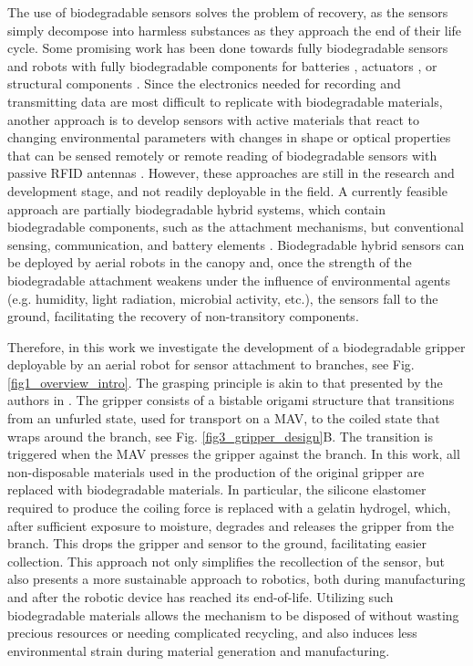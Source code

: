 The use of biodegradable sensors solves the problem of recovery, as the sensors simply decompose into harmless substances as they approach the end of their life cycle. Some promising work has been done towards fully biodegradable sensors and robots \cite{Sethi2022, Hartmann2021} with fully biodegradable components for batteries \cite{Yin2014, Wang2021, MicrobialCell}, actuators \cite{Baumgartner2020}, or structural components \cite{Wiesemuller2021Self-sensingStiffness, Hardman20213DStructures, Shintake2017}. Since the electronics needed for recording and transmitting data are most difficult to replicate with biodegradable materials, another approach is to develop sensors with active materials that react to changing environmental parameters with changes in shape or optical properties that can be sensed remotely \cite{Mazzolai2021} or remote reading of biodegradable sensors with passive RFID antennas \cite{Gopalakrishnan2022}. However, these approaches are still in the research and development stage, and not readily deployable in the field. A currently feasible approach are partially biodegradable hybrid systems, which contain biodegradable components, such as the attachment mechanisms, but conventional sensing, communication, and battery elements \cite{Sethi2022}. Biodegradable hybrid sensors can be deployed by aerial robots in the canopy and, once the strength of the biodegradable attachment weakens under the influence of environmental agents (e.g. humidity, light radiation, microbial activity, etc.), the sensors fall to the ground, facilitating the recovery of non-transitory components.

Therefore, in this work we investigate the development of a biodegradable gripper deployable by an aerial robot for sensor attachment to branches, see Fig. \ref{fig1_overview_intro}. The grasping principle is akin to that presented by the authors in \cite{Geckeler2022a}. The gripper consists of a bistable origami structure that transitions from an unfurled state, used for transport on a MAV, to the coiled state that wraps around the branch, see Fig. \ref{fig3_gripper_design}B. The transition is triggered when the MAV presses the gripper against the branch. In this work, all non-disposable materials used in the production of the original gripper \cite{Geckeler2022a} are replaced with biodegradable materials. In particular, the silicone elastomer required to produce the coiling force is replaced with a gelatin hydrogel, which, after sufficient exposure to moisture, degrades and releases the gripper from the branch. This drops the gripper and sensor to the ground, facilitating easier collection. This approach not only simplifies the recollection of the sensor, but also presents a more sustainable approach to robotics, both during manufacturing and after the robotic device has reached its end-of-life. Utilizing such biodegradable materials allows the mechanism to be disposed of without wasting precious resources or needing complicated recycling, and also induces less environmental strain during material generation and manufacturing.

